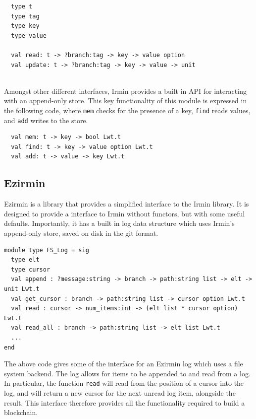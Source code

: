 \documentclass[12pt,a4paper,twoside,openright]{report}
\begin{document}
		\begin{lstlisting}
  type t
  type tag
  type key 
  type value

  val read: t -> ?branch:tag -> key -> value option
  val update: t -> ?branch:tag -> key -> value -> unit
			
		\end{lstlisting}
		Amongst other different interfaces, Irmin provides a built in API for interacting with an append-only store. This key functionality of this module is expressed in the following code, where \texttt{mem} checks for the presence of a key, \texttt{find} reads values, and \texttt{add} writes to the store.

		\begin{lstlisting}
  val mem: t -> key -> bool Lwt.t
  val find: t -> key -> value option Lwt.t
  val add: t -> value -> key Lwt.t
		\end{lstlisting}
	\subsection{Ezirmin}
	Ezirmin is a library that provides a simplified interface to the Irmin library. It is designed to provide a interface to Irmin without functors, but with some useful defaults. Importantly, it has a built in log data structure which uses Irmin's append-only store, saved on disk in the git format.\\
	\begin{lstlisting}
module type FS_Log = sig
  type elt 
  type cursor 
  val append : ?message:string -> branch -> path:string list -> elt -> unit Lwt.t
  val get_cursor : branch -> path:string list -> cursor option Lwt.t
  val read : cursor -> num_items:int -> (elt list * cursor option) Lwt.t
  val read_all : branch -> path:string list -> elt list Lwt.t
  ...
end
	\end{lstlisting}
	The above code gives some of the interface for an Ezirmin log which uses a file system backend.
	The log allows for items to be appended to and read from a log.
	In particular, the function \texttt{read} will read from the position of a cursor into the log, and will return a new cursor for the next unread log item, alongside the result.
	This interface therefore provides all the functionality required to build a blockchain.\\
\end{document}
